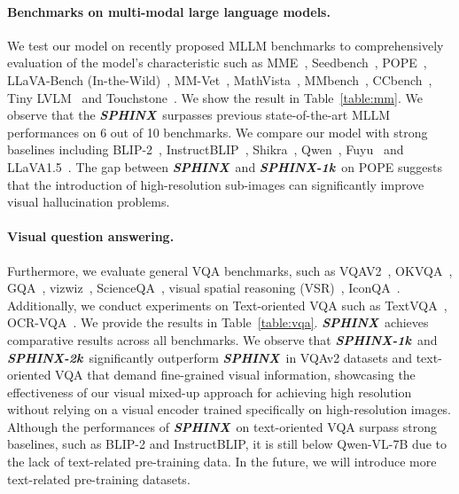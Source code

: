 \documentclass{article} \usepackage{iclr2024_conference,times}
\newcommand{\sphinx}{\textcolor{Goldenrod3}{\textbf{\textit{SPHINX}}}~}
\newcommand{\sphinxonek}{\textcolor{Goldenrod3}{\textbf{\textit{SPHINX-1k}}}~}
\newcommand{\sphinxtwok}{\textcolor{Goldenrod3}{\textbf{\textit{SPHINX-2k}}}~}
\begin{document}
\paragraph{Benchmarks on multi-modal large language models.}
We test our model on recently proposed MLLM benchmarks to comprehensively evaluation of the model's characteristic such as MME~\citep{fu2023mme}, Seedbench~\citep{Li2023SEEDBenchBM}, POPE~\citep{Li2023EvaluatingOH}, LLaVA-Bench (In-the-Wild)~\citep{llava}, MM-Vet~\citep{Yu2023MMVetEL}, MathVista~\citep{Lu2023MathVistaEM}, MMbench~\citep{liu2023mmbench}, CCbench~\citep{2023opencompass}, Tiny LVLM~\citep{shao2023tiny} and Touchstone~\citep{bai2023touchstone}. We show the result in Table~\ref{table:mm}. We observe that the \sphinx surpasses previous state-of-the-art MLLM performances on 6 out of 10 benchmarks. We compare our model with strong baselines including BLIP-2~\citep{li2023blip}, InstructBLIP~\citep{Dai2023InstructBLIPTG}, Shikra~\citep{chen2023shikra}, Qwen~\citep{Bai2023QwenVLAF}, Fuyu~\citep{fuyu-8b} and LLaVA1.5~\citep{Liu2023ImprovedBW}. The gap between \sphinx and \sphinxonek on POPE suggests that the introduction of high-resolution sub-images can significantly improve visual hallucination problems. 

\paragraph{Visual question answering.}
Furthermore, we evaluate general VQA benchmarks, such as VQAV2~\citep{Agrawal2015VQAVQ}, OKVQA~\citep{Marino2019OKVQAAV}, GQA~\citep{Hudson2019GQAAN}, vizwiz~\citep{Gurari2018VizWizGC}, ScienceQA~\citep{lu2022learn}, visual spatial reasoning (VSR)~\citep{Liu2022VisualSR}, IconQA~\citep{lu2021iconqa}. Additionally, we conduct experiments on Text-oriented VQA such as TextVQA~\citep{Singh2019TowardsVM}, OCR-VQA~\citep{Mishra2019OCRVQAVQ}. We provide the results in Table~\ref{table:vqa}. \sphinx achieves comparative results across all benchmarks. We observe that \sphinxonek and \sphinxtwok significantly outperform \sphinx in VQAv2 datasets and text-oriented VQA that demand fine-grained visual information, showcasing the effectiveness of our visual mixed-up approach for achieving high resolution without relying on a visual encoder trained specifically on high-resolution images. Although the performances of \sphinx on text-oriented VQA surpass strong baselines, such as BLIP-2 and InstructBLIP, it is still below Qwen-VL-7B due to the lack of text-related pre-training data. In the future, we will introduce more text-related pre-training datasets. 
\end{document}
